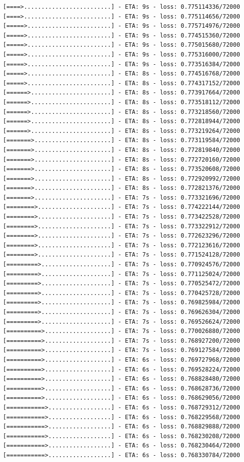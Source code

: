 \documentclass[12pt,fleqn]{article}\usepackage{../../common}
\begin{document}
\begin{verbatim}
[====>.........................] - ETA: 9s - loss: 0.775114336/72000 [====>.........................] - ETA: 9s - loss: 0.775114656/72000 [=====>........................] - ETA: 9s - loss: 0.775714976/72000 [=====>........................] - ETA: 9s - loss: 0.774515360/72000 [=====>........................] - ETA: 9s - loss: 0.775015680/72000 [=====>........................] - ETA: 9s - loss: 0.775316000/72000 [=====>........................] - ETA: 9s - loss: 0.773516384/72000 [=====>........................] - ETA: 8s - loss: 0.774516768/72000 [=====>........................] - ETA: 8s - loss: 0.774317152/72000 [======>.......................] - ETA: 8s - loss: 0.773917664/72000 [======>.......................] - ETA: 8s - loss: 0.773518112/72000 [======>.......................] - ETA: 8s - loss: 0.773218560/72000 [======>.......................] - ETA: 8s - loss: 0.772818944/72000 [======>.......................] - ETA: 8s - loss: 0.773219264/72000 [=======>......................] - ETA: 8s - loss: 0.773119584/72000 [=======>......................] - ETA: 8s - loss: 0.772819840/72000 [=======>......................] - ETA: 8s - loss: 0.772720160/72000 [=======>......................] - ETA: 8s - loss: 0.773520608/72000 [=======>......................] - ETA: 8s - loss: 0.772920992/72000 [=======>......................] - ETA: 8s - loss: 0.772821376/72000 [=======>......................] - ETA: 7s - loss: 0.773321696/72000 [========>.....................] - ETA: 7s - loss: 0.774222144/72000 [========>.....................] - ETA: 7s - loss: 0.773422528/72000 [========>.....................] - ETA: 7s - loss: 0.773322912/72000 [========>.....................] - ETA: 7s - loss: 0.772623296/72000 [========>.....................] - ETA: 7s - loss: 0.772123616/72000 [========>.....................] - ETA: 7s - loss: 0.771524128/72000 [=========>....................] - ETA: 7s - loss: 0.770924576/72000 [=========>....................] - ETA: 7s - loss: 0.771125024/72000 [=========>....................] - ETA: 7s - loss: 0.770525472/72000 [=========>....................] - ETA: 7s - loss: 0.770425728/72000 [=========>....................] - ETA: 7s - loss: 0.769825984/72000 [=========>....................] - ETA: 7s - loss: 0.769626304/72000 [=========>....................] - ETA: 7s - loss: 0.769526624/72000 [==========>...................] - ETA: 7s - loss: 0.770026880/72000 [==========>...................] - ETA: 7s - loss: 0.768927200/72000 [==========>...................] - ETA: 7s - loss: 0.769127584/72000 [==========>...................] - ETA: 6s - loss: 0.769727968/72000 [==========>...................] - ETA: 6s - loss: 0.769528224/72000 [==========>...................] - ETA: 6s - loss: 0.768828480/72000 [==========>...................] - ETA: 6s - loss: 0.768628736/72000 [==========>...................] - ETA: 6s - loss: 0.768629056/72000 [===========>..................] - ETA: 6s - loss: 0.768729312/72000 [===========>..................] - ETA: 6s - loss: 0.768229568/72000 [===========>..................] - ETA: 6s - loss: 0.768829888/72000 [===========>..................] - ETA: 6s - loss: 0.768230208/72000 [===========>..................] - ETA: 6s - loss: 0.768230464/72000 [===========>..................] - ETA: 6s - loss: 0.768330784/72000 
\end{verbatim}
\end{document}
